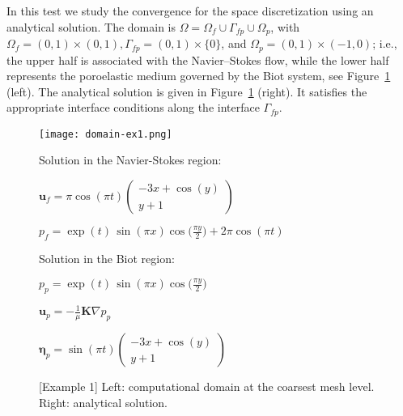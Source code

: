 \documentclass[11pt]{article}
\numberwithin{equation}{section}
\newcommand{\ds}{\displaystyle}
\newcommand{\bbeta}{{\boldsymbol\eta}}
\newcommand{\bu}{\mathbf{u}}
\newcommand{\0}{{\mathbf{0}}}
\def\bK{\mathbf{K}}
\numberwithin{equation}{section}
\begin{document}
In this test we study the convergence for the space discretization using an analytical solution.
The domain is $\Omega = \Omega_f\cup\Gamma_{fp}\cup\Omega_p$, with $\Omega_f = (0,1)\times (0,1), \Gamma_{fp} = (0,1)\times\{0\}$, and $\Omega_p = (0,1)\times (-1,0)$; i.e.,
the upper half is associated with the Navier--Stokes flow, while the lower half represents the poroelastic medium governed by the Biot system, see Figure~\ref{fig:example1} (left). The analytical solution is given in Figure~\ref{fig:example1} (right). It satisfies the appropriate interface conditions along the interface $\Gamma_{fp}$.
%
\begin{figure}[htb!]
\begin{minipage}{.49\textwidth}
\centering\texttt{[image: domain-ex1.png]}
\end{minipage}
%
\hfill
\begin{minipage}{.5\textwidth}

Solution in the Navier-Stokes region:

  \bigskip
$ \ds \bu_f = \pi \cos(\pi t)
\begin{pmatrix}
\ds -3x + \cos(y) \\[1ex] \ds y+1
\end{pmatrix}$

\smallskip
$ \ds p_f = \exp(t)\,\sin(\pi x)\cos\Big(\frac{\pi y}{2}\Big) + 2\pi \cos(\pi t)$

\bigskip
\bigskip
Solution in the Biot region:

\bigskip
$\ds p_p = \exp(t)\,\sin(\pi x)\cos\Big(\frac{\pi y}{2}\Big)$

$\ds \bu_p = -\frac{1}{\mu} \bK \nabla p_p $

$ \ds \bbeta_p = \sin(\pi t) \begin{pmatrix} \ds -3x+\cos(y) \\[1ex] \ds y+1 \end{pmatrix}$
\end{minipage}
\caption{[Example 1] Left: computational domain at the coarsest mesh level. Right: analytical solution.}
\label{fig:example1}
\end{figure}
\end{document}
